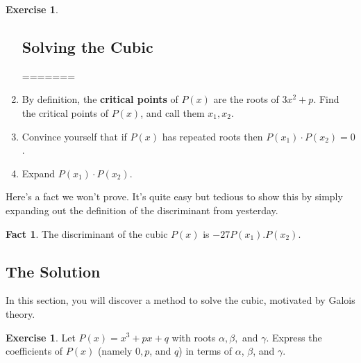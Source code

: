 \documentclass[reqno, 12pt, letter]{article}
\theoremstyle{plain}
\theoremstyle{definition}
\newtheorem{exercise}[theorem]{Exercise}
\newtheorem{fact}[theorem]{Fact}
\theoremstyle{remark}
\numberwithin{equation}{section}
\begin{document}
	\begin{exercise}
		\begin{enumerate}
	
	\subsection{Solving the Cubic}
	

=======
			\item By definition, the {\bf critical points} of $P(x)$ are the roots of $3x^2 + p$. Find the critical points of $ P(x)$, and call them $ x_1, x_2$.
			\item Convince yourself that if $ P(x)$ has repeated roots then $ P(x_1) \cdot P(x_2) = 0$. 
			\item Expand $ P(x_1) \cdot P(x_2)$.
		\end{enumerate}
	\end{exercise}
	Here's a fact we won't prove. It's quite easy but tedious to show this by simply expanding out the definition of the discriminant from yesterday.
	\begin{fact}
		The discriminant of the cubic $ P(x)$ is $ -27P(x_1).P(x_2)$.
	\end{fact}
	
	\subsection{The Solution}
%		
%		
In this section, you will discover a method to solve the cubic, motivated by Galois theory.
	\begin{exercise}
	\label{exercise:coefficients_depressed_cubic}
		Let $P(x) = x^3 + px + q$ with roots $\alpha, \beta,$ and $\gamma$. Express the coefficients of $P(x)$ (namely $ 0,p$, and $q$) in terms of $\alpha$, $\beta$, and $\gamma$.
	\end{exercise}
\end{document}
